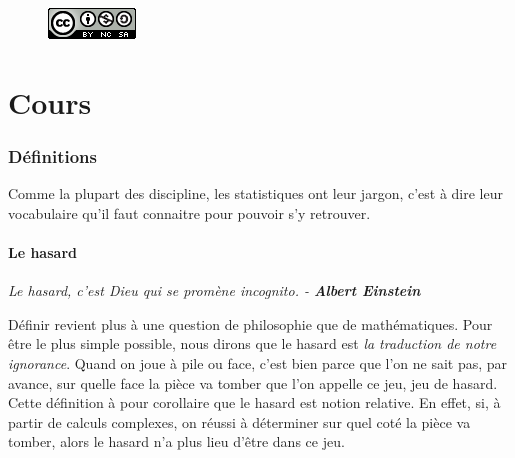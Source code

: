 





\begin{figure}[H]\begin{flushright}\includegraphics[scale=0.5]{Ilu/licenceCC.png}\end{flushright}\end{figure}

\newpage
\tableofcontents

\newpage

\part{Cours}
\section{Définitions}
Comme la plupart des discipline, les statistiques ont leur jargon, c'est à dire leur vocabulaire qu'il faut connaitre pour pouvoir s'y retrouver.
\subsection{Le hasard}

\begin{flushright}
\textit{Le hasard, c'est Dieu qui se promène incognito. - \textbf{Albert Einstein} }
\end{flushright}

Définir revient plus à une question de philosophie que de mathématiques.\newline
Pour être le plus simple possible, nous dirons que le hasard est \textit{la traduction de notre ignorance}. \newline
Quand on joue à pile ou face, c'est bien parce que l'on ne sait pas, par avance, sur quelle face la pièce va tomber que l'on appelle ce jeu, jeu de hasard.\newline
Cette définition à pour corollaire que le hasard est notion relative. En effet, si, à partir de calculs complexes, on réussi à déterminer sur quel coté la pièce va tomber, alors le hasard n'a plus lieu d'être dans ce jeu.
